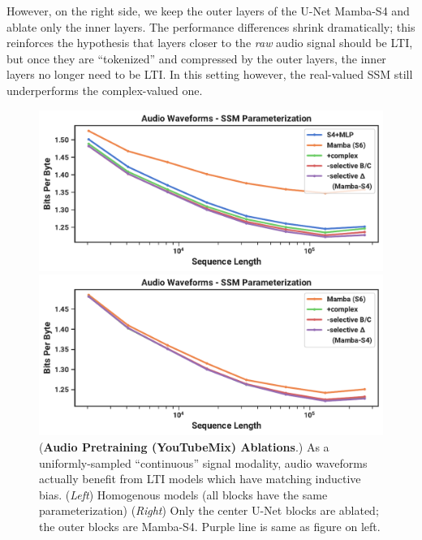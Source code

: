 However, on the right side, we keep the outer layers of the U-Net Mamba-S4 and ablate only the inner layers.
The performance differences shrink dramatically; this reinforces the hypothesis that layers closer to the \emph{raw} audio signal should be LTI,
but once they are ``tokenized'' and compressed by the outer layers, the inner layers no longer need to be LTI.
In this setting however, the real-valued SSM still underperforms the complex-valued one.

\begin{figure}
  \begin{minipage}[t]{.49\linewidth}
    \centering
    \includegraphics[width=\linewidth]{fig/youtubemix_ablations.pdf}
  \end{minipage}
  \hfill
  \begin{minipage}[t]{.49\linewidth}
    \centering
    \includegraphics[width=\linewidth]{fig/youtubemix_ablations_center.pdf}
  \end{minipage}
  \captionsetup{type=figure}
  \caption{
    (\textbf{Audio Pretraining (YouTubeMix) Ablations}.)
    As a uniformly-sampled ``continuous'' signal modality, audio waveforms actually benefit from LTI models which have matching inductive bias.
    (\emph{Left}) Homogenous models (all blocks have the same parameterization)
    (\emph{Right}) Only the center U-Net blocks are ablated; the outer blocks are Mamba-S4. Purple line is same as figure on left.
  }
  \label{fig:youtubemix-ablations}
\end{figure}

